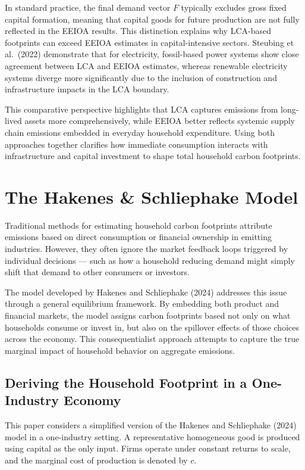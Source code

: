 \documentclass[12pt,a4paper]{article}%
\begin{document}
In standard practice, the final demand vector $F$ typically excludes gross fixed capital formation, meaning that capital goods for future production are not fully reflected in the EEIOA results. This distinction explains why LCA-based footprints can exceed EEIOA estimates in capital-intensive sectors. Steubing et al.~(2022) demonstrate that for electricity, fossil-based power systems show close agreement between LCA and EEIOA estimates, whereas renewable electricity systems diverge more significantly due to the inclusion of construction and infrastructure impacts in the LCA boundary.

This comparative perspective highlights that LCA captures emissions from long-lived assets more comprehensively, while EEIOA better reflects systemic supply chain emissions embedded in everyday household expenditure. Using both approaches together clarifies how immediate consumption interacts with infrastructure and capital investment to shape total household carbon footprints.

\section{The Hakenes \& Schliephake Model}

Traditional methods for estimating household carbon footprints attribute emissions based on direct consumption or financial ownership in emitting industries. However, they often ignore the market feedback loops triggered by individual decisions — such as how a household reducing demand might simply shift that demand to other consumers or investors.

The model developed by Hakenes and Schliephake (2024) addresses this issue through a general equilibrium framework. By embedding both product and financial markets, the model assigns carbon footprints based not only on what households consume or invest in, but also on the spillover effects of those choices across the economy. This consequentialist approach attempts to capture the true marginal impact of household behavior on aggregate emissions.

\subsection{Deriving the Household Footprint in a One-Industry Economy}

This paper considers a simplified version of the Hakenes and Schliephake (2024) model in a one-industry setting. A representative homogeneous good is produced using capital as the only input. Firms operate under constant returns to scale, and the marginal cost of production is denoted by $c$.
\end{document}
